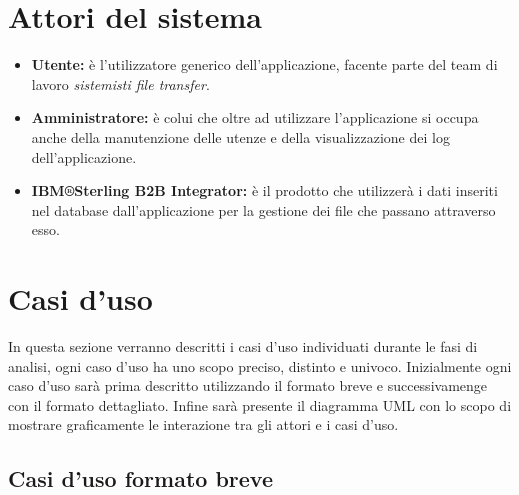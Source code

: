 


\section{Attori del sistema}

\begin{itemize}
    \item \textbf{Utente:} è l'utilizzatore generico dell'applicazione, facente parte del team di lavoro \textit{sistemisti file transfer}.  
     \item \textbf{Amministratore:} è colui che oltre ad utilizzare l'applicazione si occupa anche della manutenzione delle utenze e della visualizzazione dei \gls{log} dell'applicazione.
    \item \textbf{IBM®Sterling B2B Integrator:} è il prodotto che utilizzerà i dati inseriti nel database dall'applicazione per la gestione dei file che passano attraverso esso. 
\end{itemize}



\section{Casi d'uso}

In questa sezione verranno descritti i casi d'uso individuati durante le fasi di analisi, ogni caso d’uso ha uno scopo preciso, distinto e univoco. Inizialmente ogni caso d'uso sarà prima descritto utilizzando il formato breve e successivamenge con il formato dettagliato. Infine sarà presente il diagramma \gls{UML} con lo scopo di mostrare graficamente le interazione tra gli attori e i casi d'uso.

\subsection{Casi d'uso formato breve}


